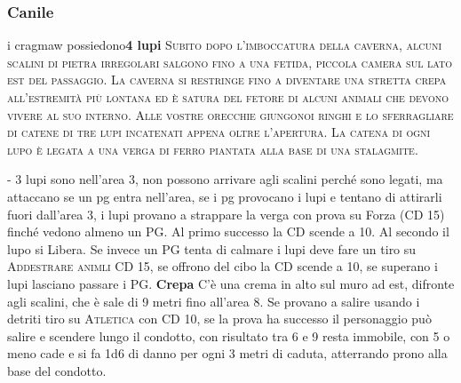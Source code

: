 \documentclass{article}
\begin{document}
\subsubsection{Canile}
i cragmaw possiedono\textbf{4 lupi} \newline
\textsc{Subito dopo l’imboccatura della caverna, alcuni scalini di
pietra irregolari salgono fino a una fetida, piccola camera sul
lato est del passaggio. La caverna si restringe fino a diventare
una stretta crepa all’estremità più lontana ed è satura del
fetore di alcuni animali che devono vivere al suo interno. Alle
vostre orecchie giungonoi ringhi e lo sferragliare di catene di
tre lupi incatenati appena oltre l'apertura. La catena di ogni
lupo è legata a una verga di ferro piantata alla base di una
stalagmite.}\newline

- 3 lupi sono nell'area 3, non possono arrivare agli scalini perché sono legati, ma attaccano se un pg entra nell'area, se i pg provocano i lupi e tentano di attirarli fuori dall'area 3, i lupi provano a strappare la verga con prova su Forza (CD 15) finché vedono almeno un PG. Al primo successo la CD scende a 10. Al secondo il lupo si Libera. \newline
Se invece un PG tenta di calmare i lupi deve fare un tiro su \textsc{Addestrare animli} CD 15, se offrono del cibo la CD scende a 10, se superano i lupi lasciano passare i PG.\newline
\textbf{Crepa} C'è una crema in alto sul muro ad est, difronte agli scalini, che è sale di 9 metri fino all'area 8. Se provano a salire usando i detriti tiro su \textsc{Atletica} con CD 10, se la prova ha successo il personaggio può salire e scendere lungo il condotto, con risultato tra 6 e 9 resta immobile, con 5 o meno cade e si fa 1d6 di danno per ogni 3 metri di caduta, atterrando prono alla base del condotto.
\end{document}
